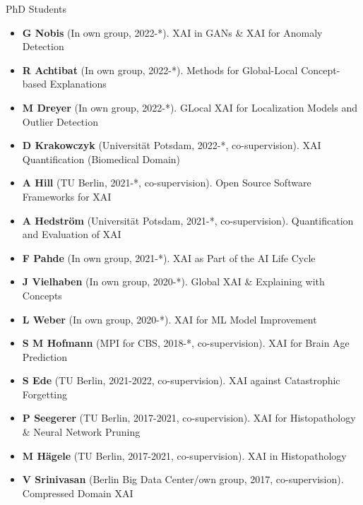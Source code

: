 
\newcommand{\supervision}[3]{\textbf{#1} (In own group, #2). {\small #3}}
\newcommand{\cosupervision}[4]{\textbf{#1} (#2, #3, co-supervision). {\small #4}}

\headedsection 
{PhD Students}
{
    \begin{itemize}
        \item [] \supervision{G Nobis}{2022-*}{XAI in GANs \& XAI for Anomaly Detection}
        \item [] \supervision{R Achtibat}{2022-*}{Methods for Global-Local Concept-based Explanations}
        \item [] \supervision{M Dreyer}{2022-*}{GLocal XAI for Localization Models and Outlier Detection}
        
        \item [] \cosupervision{D Krakowczyk}{Universität Potsdam}{2022-*}{XAI Quantification (Biomedical Domain)}
        \item [] \cosupervision{A Hill}{TU Berlin}{2021-*}{Open Source Software Frameworks for XAI}
        \item [] \cosupervision{A Hedström}{Universität Potsdam}{2021-*}{Quantification and Evaluation of XAI}

        \item [] \supervision{F Pahde}{2021-*}{XAI as Part of the AI Life Cycle}
        \item [] \supervision{J Vielhaben}{2020-*}{Global XAI \& Explaining with Concepts}
        \item [] \supervision{L Weber}{2020-*}{XAI for ML Model Improvement}  
        
        \item [] \cosupervision{S M Hofmann}{MPI for CBS}{2018-*}{XAI for Brain Age Prediction}
        
        \item [] \cosupervision{S Ede}{TU Berlin}{2021-2022}{XAI against Catastrophic Forgetting}
        \item [] \cosupervision{P Seegerer}{TU Berlin}{2017-2021}{XAI for Histopathology \& Neural Network Pruning}
        \item [] \cosupervision{M Hägele}{TU Berlin}{2017-2021}{XAI in Histopathology}
        \item [] \cosupervision{V Srinivasan}{Berlin Big Data Center/own group}{2017}{Compressed Domain XAI}
                
        
        
    \end{itemize}
}

